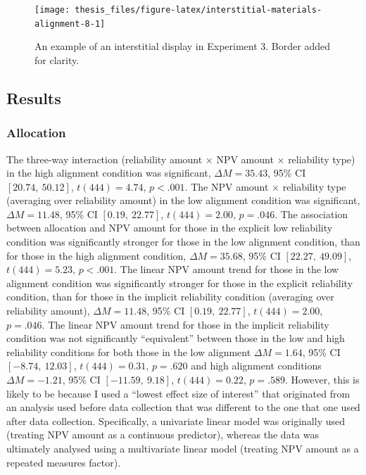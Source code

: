 \documentclass[a4paper, nobind, dvipsnames]{templates/ociamthesis}
\theoremstyle{definition}
\theoremstyle{definition}
\theoremstyle{definition}
\theoremstyle{definition}
\theoremstyle{remark}
\begin{document}
\begin{figure}
\texttt{[image: thesis\_files/figure-latex/interstitial-materials-alignment-8-1]} \caption{An example of an interstitial display in Experiment 3. Border added for clarity.}\label{fig:interstitial-materials-alignment-8}
\end{figure}

\hypertarget{results-6}{%
\subsection{Results}\label{results-6}}

\hypertarget{results-alignment-8-allocation}{%
\subsubsection{Allocation}\label{results-alignment-8-allocation}}

The three-way interaction
(reliability amount \(\times\) NPV amount \(\times\) reliability type) in the high
alignment condition was significant,
\(\Delta M = 35.43\), 95\% CI \([20.74,~50.12]\), \(t(444) = 4.74\), \(p < .001\). The NPV amount
\(\times\) reliability type (averaging over reliability amount) in the low
alignment condition was significant,
\(\Delta M = 11.48\), 95\% CI \([0.19,~22.77]\), \(t(444) = 2.00\), \(p = .046\). The association
between allocation and NPV amount for those in the explicit low reliability
condition was significantly stronger for those in the low alignment condition,
than for those in the high alignment condition,
\(\Delta M = 35.68\), 95\% CI \([22.27,~49.09]\), \(t(444) = 5.23\), \(p < .001\).
The linear NPV amount trend for those in the low alignment condition was
significantly stronger for those in the explicit reliability condition, than for
those in the implicit reliability condition (averaging over reliability amount),
\(\Delta M = 11.48\), 95\% CI \([0.19,~22.77]\), \(t(444) = 2.00\), \(p = .046\). The linear
NPV amount trend for those in the implicit reliability condition was not
significantly ``equivalent'' between those in the low and high reliability
conditions for both those in the low alignment
\(\Delta M = 1.64\), 95\% CI \([-8.74,~12.03]\), \(t(444) = 0.31\), \(p = .620\)
and high alignment conditions
\(\Delta M = -1.21\), 95\% CI \([-11.59,~9.18]\), \(t(444) = 0.22\), \(p = .589\).
However, this is likely to be because I used a ``lowest effect size of interest''
that originated from an analysis used before data collection that was different
to the one that one used after data collection. Specifically, a univariate
linear model was originally used (treating NPV amount as a continuous
predictor), whereas the data was ultimately analysed using a multivariate linear
model (treating NPV amount as a repeated measures factor).
\end{document}

